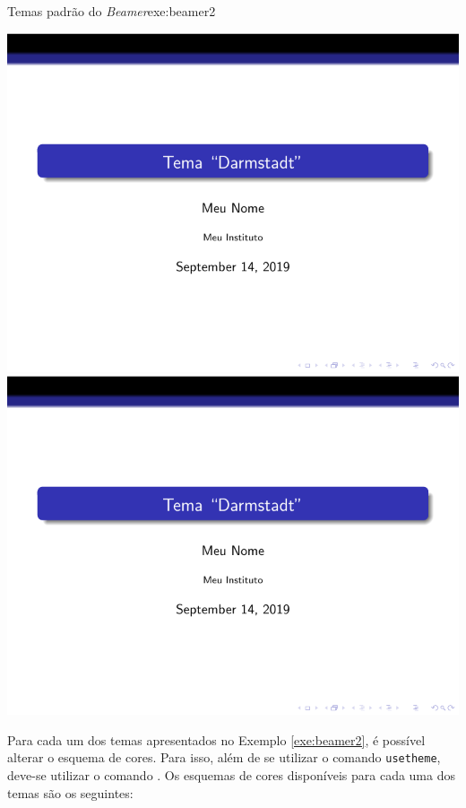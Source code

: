 \begin{texexptitled}{Temas padrão do \textit{Beamer}}{exe:beamer2}
\begin{tcbitemize}[raster columns=3,bicolor,
raster equal height,boxrule=0.1mm,
colframe=MaterialGreen900,colback=MaterialGrey50,
pdf comment]
\tcbitem[squeezed title={Szeged}]     \centering \includegraphics[scale=0.28,page=18]{./docs/figs/beamer.pdf}
\tcbitem[squeezed title={Warsaw}]     \centering \includegraphics[scale=0.28,page=19]{./docs/figs/beamer.pdf}
\end{tcbitemize}
\end{texexptitled}

Para cada um dos temas apresentados no Exemplo \ref{exe:beamer2}, é possível alterar o esquema de cores. Para isso, além de se utilizar o comando {\tt usetheme}, deve-se utilizar o comando . Os esquemas de cores disponíveis para cada uma dos temas são os seguintes:

